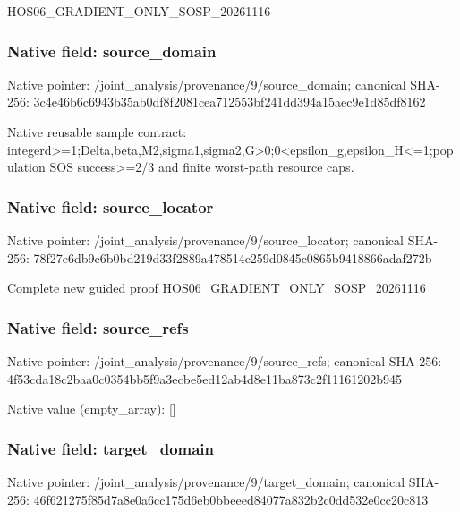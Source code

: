 \documentclass[10pt,a4paper]{article}
\begin{document}
\begingroup\raggedright\sloppy HOS06\_\allowbreak{}GRADIENT\_\allowbreak{}ONLY\_\allowbreak{}SOSP\_\allowbreak{}20261116\par\endgroup

\subsubsection{Native field: source\_\allowbreak{}domain}
Native pointer: /joint\_\allowbreak{}analysis/provenance/9/source\_\allowbreak{}domain; canonical SHA-256: 3c4e46b6c6943b35ab0df8f2081cea712553bf241dd394a15aec9e1d85df8162

\begingroup\raggedright\sloppy Native reusable sample contract:\allowbreak{} integerd>=\allowbreak{}1;\allowbreak{}Delta,\allowbreak{}beta,\allowbreak{}M2,\allowbreak{}sigma1,\allowbreak{}sigma2,\allowbreak{}G>0;\allowbreak{}0<epsilon\_\allowbreak{}g,\allowbreak{}epsilon\_\allowbreak{}H<=\allowbreak{}1;\allowbreak{}population SOS success>=\allowbreak{}2/\allowbreak{}3 and finite worst-path resource caps.\par\endgroup

\subsubsection{Native field: source\_\allowbreak{}locator}
Native pointer: /joint\_\allowbreak{}analysis/provenance/9/source\_\allowbreak{}locator; canonical SHA-256: 78f27e6db9c6b0bd219d33f2889a478514c259d0845c0865b9418866adaf272b

\begingroup\raggedright\sloppy Complete new guided proof HOS06\_\allowbreak{}GRADIENT\_\allowbreak{}ONLY\_\allowbreak{}SOSP\_\allowbreak{}20261116\par\endgroup

\subsubsection{Native field: source\_\allowbreak{}refs}
Native pointer: /joint\_\allowbreak{}analysis/provenance/9/source\_\allowbreak{}refs; canonical SHA-256: 4f53cda18c2baa0c0354bb5f9a3ecbe5ed12ab4d8e11ba873c2f11161202b945

Native value (empty\_\allowbreak{}array): []

\subsubsection{Native field: target\_\allowbreak{}domain}
Native pointer: /joint\_\allowbreak{}analysis/provenance/9/target\_\allowbreak{}domain; canonical SHA-256: 46f621275f85d7a8e0a6cc175d6eb0bbeeed84077a832b2c0dd532e0cc20c813
\end{document}
